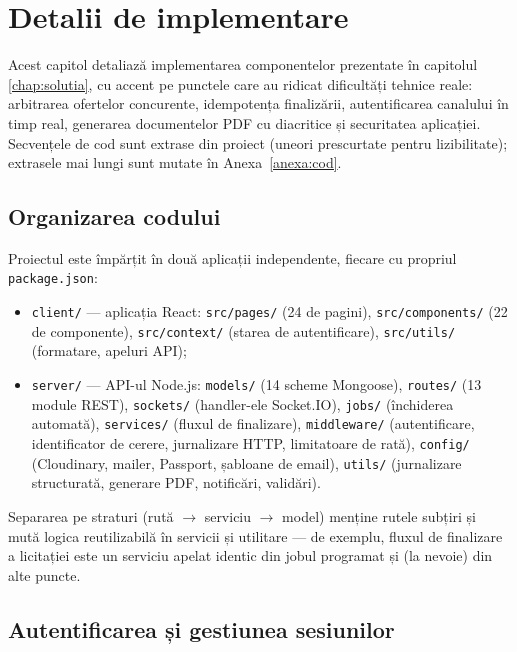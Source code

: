 \chapter{Detalii de implementare}
\label{chap:implementare}

Acest capitol detaliază implementarea componentelor prezentate în capitolul \ref{chap:solutia}, cu accent pe punctele care au ridicat dificultăți tehnice reale: arbitrarea ofertelor concurente, idempotența finalizării, autentificarea canalului în timp real, generarea documentelor PDF cu diacritice și securitatea aplicației. Secvențele de cod sunt extrase din proiect (uneori prescurtate pentru lizibilitate); extrasele mai lungi sunt mutate în Anexa~\ref{anexa:cod}.

\section{Organizarea codului}

Proiectul este împărțit în două aplicații independente, fiecare cu propriul \texttt{package.json}:

\begin{itemize}
    \item \texttt{client/} --- aplicația React: \texttt{src/pages/} (24 de pagini), \texttt{src/components/} (22 de componente), \texttt{src/context/} (starea de autentificare), \texttt{src/utils/} (formatare, apeluri API);
    \item \texttt{server/} --- API-ul Node.js: \texttt{models/} (14 scheme Mongoose), \texttt{routes/} (13 module REST), \texttt{sockets/} (handler-ele Socket.IO), \texttt{jobs/} (închiderea automată), \texttt{services/} (fluxul de finalizare), \texttt{middleware/} (autentificare, identificator de cerere, jurnalizare HTTP, limitatoare de rată), \texttt{config/} (Cloudinary, mailer, Passport, șabloane de email), \texttt{utils/} (jurnalizare structurată, generare PDF, notificări, validări).
\end{itemize}

Separarea pe straturi (rută $\to$ serviciu $\to$ model) menține rutele subțiri și mută logica reutilizabilă în servicii și utilitare --- de exemplu, fluxul de finalizare a licitației este un serviciu apelat identic din jobul programat și (la nevoie) din alte puncte.

\section{Autentificarea și gestiunea sesiunilor}

